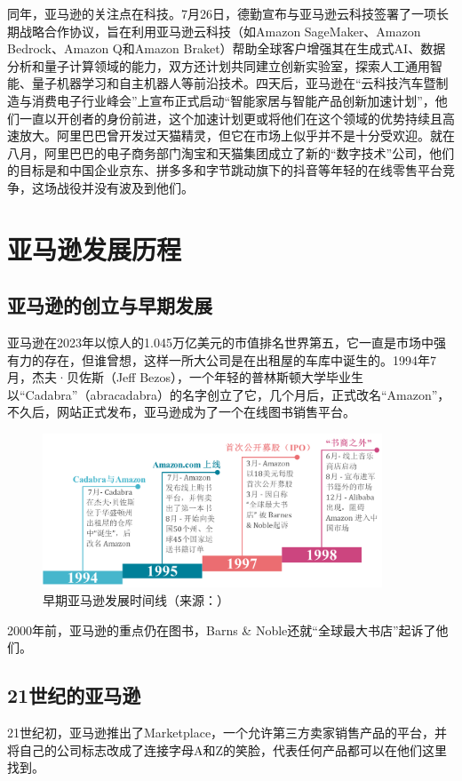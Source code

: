 \documentclass[12pt]{ctexart}
\begin{document}
同年，亚马逊的关注点在科技。7月26日，德勤宣布与亚马逊云科技签署了一项长期战略合作协议，旨在利用亚马逊云科技（如Amazon SageMaker、Amazon Bedrock、Amazon Q和Amazon Braket）帮助全球客户增强其在生成式AI、数据分析和量子计算领域的能力，双方还计划共同建立创新实验室，探索人工通用智能、量子机器学习和自主机器人等前沿技术\cite{29}。四天后，亚马逊在“云科技汽车暨制造与消费电子行业峰会”上宣布正式启动“智能家居与智能产品创新加速计划”\cite{30}，他们一直以开创者的身份前进，这个加速计划更或将他们在这个领域的优势持续且高速放大。阿里巴巴曾开发过天猫精灵，但它在市场上似乎并不是十分受欢迎。就在八月，阿里巴巴的电子商务部门淘宝和天猫集团成立了新的“数字技术”公司，他们的目标是和中国企业京东、拼多多和字节跳动旗下的抖音等年轻的在线零售平台竞争，这场战役并没有波及到他们。


\section{亚马逊发展历程}

\subsection{亚马逊的创立与早期发展}
亚马逊在2023年以惊人的1.045万亿美元的市值排名世界第五\cite{13}，它一直是市场中强有力的存在，但谁曾想，这样一所大公司是在出租屋的车库中诞生的。1994年7月，杰夫·贝佐斯（Jeff Bezos），一个年轻的普林斯顿大学毕业生以“Cadabra”（abracadabra）的名字创立了它，几个月后，正式改名“Amazon”，不久后，网站正式发布，亚马逊成为了一个在线图书销售平台。

\begin{figure}[htbp!]
    \centering
    \includegraphics[width=0.9\textwidth]{Images/3.png}
    \caption{早期亚马逊发展时间线（来源：\cite{14,15}）}
\end{figure}

2000年前，亚马逊的重点仍在图书，Barns \& Noble还就“全球最大书店”起诉了他们\cite{14}。

\subsection{21世纪的亚马逊}
21世纪初，亚马逊推出了Marketplace，一个允许第三方卖家销售产品的平台，并将自己的公司标志改成了连接字母A和Z的笑脸，代表任何产品都可以在他们这里找到。
\end{document}
